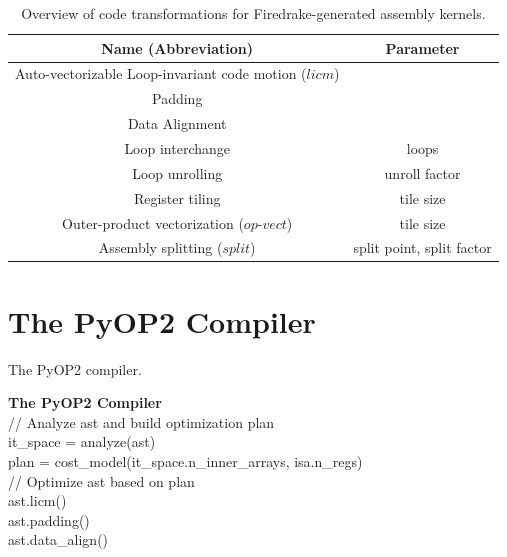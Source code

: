 \documentclass[conference]{IEEEtran}
\begin{document}
\begin{table}[h]
\begin{tabulary}{1.0\columnwidth}{|C|C|}
\hline
Name (Abbreviation) & Parameter \\\hline\hline
Auto-vectorizable Loop-invariant code motion ($licm$) &   \\ \hline
Padding &  \\ \hline
Data Alignment & \\ \hline
Loop interchange      & loops  \\ \hline
Loop unrolling  & unroll factor \\ \hline
Register tiling & tile size \\ \hline
Outer-product vectorization ($op$-$vect$) & tile size \\ \hline
Assembly splitting ($split$) & split point, split factor \\ \hline
\end{tabulary}
\caption{Overview of code transformations for Firedrake-generated assembly kernels.}
\label{table:code-transformations}
\end{table}


\section{The PyOP2 Compiler}
\label{sec:pyop2-compiler}

\begin{algorithm}[t]
\caption{The PyOP2 compiler.}
\label{algo:PyOP2Compiler}
  \textbf{The PyOP2 Compiler}\\
// Analyze ast and build optimization plan \\
it\_space = analyze(ast) \\
plan = cost\_model(it\_space.n\_inner\_arrays, isa.n\_regs) \\
// Optimize ast based on plan \\
ast.licm() \\
ast.padding() \\
ast.data\_align() \\
\end{algorithm}
\end{document}
